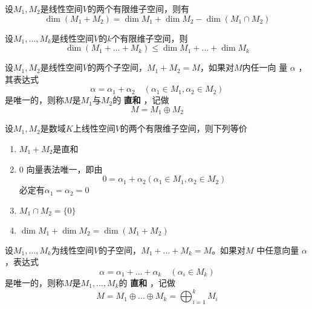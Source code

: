 \documentclass[11pt]{article}
\begin{document}
\begin{theorem}[维数公式]
设\(M_1,M_2\)是线性空间\(V\)的两个有限维子空间，则有
\begin{equation*}
\dim(M_1+M_2)=\dim M_1+\dim M_2-\dim(M_1\cap M_2)
\end{equation*}
\end{theorem}

\begin{corollary}[]
设\(M_1,\dots,M_k\)是线性空间\(V\)的\(k\)个有限维子空间，则
\begin{equation*}
\dim(M_1+\dots+M_k)\le\dim M_1+\dots+\dim M_k
\end{equation*}
\end{corollary}

\begin{definition}[]
设\(M_1,M_2\)是线性空间\(V\)的两个子空间，\(M_1+M_2=M\)，如果对\(M\)内任一向
量 \(\alpha\) ，其表达式
\begin{equation*}
\alpha=\alpha_1+\alpha_2\quad(\alpha_1\in M_1,\alpha_2\in M_2)
\end{equation*}
是唯一的，则称\(M\)是\(M_1\)与\(M_2\)的 \textbf{直和} ，记做
\begin{equation*}
M=M_1\oplus M_2
\end{equation*}
\end{definition}

\begin{theorem}[]
设\(M_1,M_2\)是数域\(K\)上线性空间\(V\)的两个有限维子空间，则下列等价
\begin{enumerate}
\item \(M_1+M_2\)是直和
\item 0 向量表法唯一，即由
\begin{equation*}
0=\alpha_1+\alpha_2(\alpha_1\in M_1,\alpha_2\in M_2)
\end{equation*}
必定有\(\alpha_1=\alpha_2=0\)
\item \(M_1\cap M_2=\{0\}\)
\item \(\dim M_1+\dim M_2=\dim(M_1+M_2)\)
\end{enumerate}
\end{theorem}

\begin{definition}[]
设\(M_1,\dots,M_k\)为线性空间\(V\)的子空间，\(M_1+\dots+M_k=M\)。如果对\(M\)
中任意向量 \(\alpha\) ，表达式
\begin{equation*}
\alpha=\alpha_1+\dots+\alpha_k\quad(\alpha_i\in M_k)
\end{equation*}
是唯一的，则称\(M\)是\(M_1,\dots,M_k\)的 \textbf{直和} ，记做
\begin{equation*}
M=M_1\oplus\dots\oplus M_k=\bigoplus_{i=1}^kM_i
\end{equation*}
\end{definition}
\end{document}
